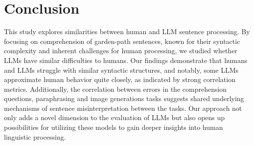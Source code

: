 \section{Conclusion}

This study explores similarities between human and LLM sentence processing. By focusing on comprehension of garden-path sentences, known for their syntactic complexity and inherent challenges for human processing, we studied whether LLMs have similar difficulties to humans. Our findings demonstrate that humans and LLMs struggle with similar syntactic structures, and notably, some LLMs approximate human behavior quite closely, as indicated by strong correlation metrics. Additionally, the correlation between errors in the comprehension questions,  paraphrasing and image generations tasks suggests shared underlying mechanisms of sentence misinterpretation between the tasks. Our approach not only adds a novel dimension to the evaluation of LLMs but also opens up possibilities for utilizing these models to gain deeper insights into human linguistic processing.